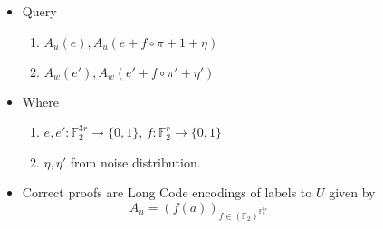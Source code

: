 \documentclass[color=usenames,dvipsnames]{beamer}
\newcommand{\F}{\mathbb{F}}
\begin{document}
\begin{frame}
\begin{columns}[c]



\pause %
\begin{itemize}

\item Query 
\begin{enumerate}
\item $A_u(e),A_u(e+ f\circ \pi + 1+\eta)$
\item $A_w(e'),A_w(e'+f\circ \pi'+ \eta')$
\end{enumerate}
\item Where 
\begin{enumerate}
\item $e,e' :\F_2^{3r} \rightarrow \{0,1\}$,  $f :\F_2^{r} \rightarrow \{0,1\}$
\item $\eta,\eta'$ from noise distribution.
\end{enumerate}
\pause
\item Correct proofs are Long Code encodings of labels to $U$ given by
$$A_u = (f(a))_{f \in  (\F_2)^{\F_2^{3r}}}$$
\end{itemize}\pause
{}
\end{columns}
\end{frame}
\end{document}
